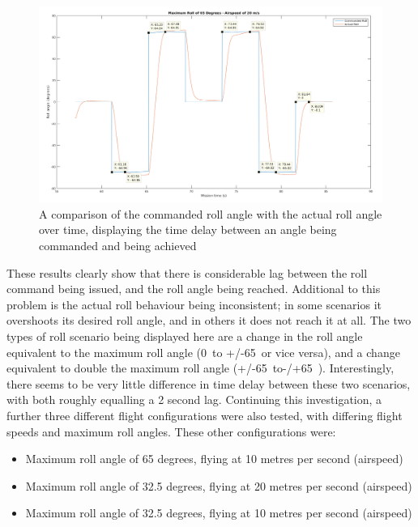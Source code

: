 \begin{figure}[htbp!] 
\centering    
\includegraphics[angle=90,height=0.9\textheight]{65_20_cursors}
\caption[Comparing commanded roll angle with actual roll over time]{A comparison of the commanded roll angle with the actual roll angle over time, displaying the time delay between an angle being commanded and being achieved}
\label{fig:6520cursors}
\end{figure} 

These results clearly show that there is considerable lag between the roll command being issued, and the roll angle being reached. Additional to this problem is the actual roll behaviour being inconsistent; in some scenarios it overshoots its desired roll angle, and in others it does not reach it at all. The two types of roll scenario being displayed here are a change in the roll angle equivalent to the maximum roll angle (0\degree\ to +/-65\degree\, or vice versa), and a change equivalent to double the maximum roll angle (+/-65\degree\ to-/+65\degree\ ). Interestingly, there seems to be very little difference in time delay between these two scenarios, with both roughly equalling a 2 second lag. Continuing this investigation, a further three different flight configurations were also tested, with differing flight speeds and maximum roll angles. These other configurations were: 

\begin{itemize}
	\item Maximum roll angle of 65 degrees, flying at 10 metres per second (airspeed)
	\item Maximum roll angle of 32.5 degrees, flying at 20 metres per second (airspeed)
	\item Maximum roll angle of 32.5 degrees, flying at 10 metres per second (airspeed)
\end{itemize}

